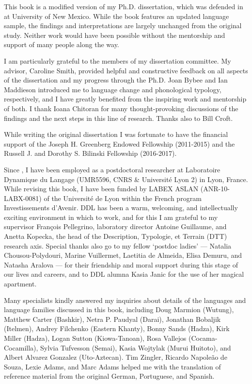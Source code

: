 \addchap{\lsAcknowledgementTitle} 

  This book is a modified version of my Ph.D. dissertation, which was defended in \citealt{May2017} at University of New Mexico. While the book features an updated language sample, the findings and interpretations are largely unchanged from the original study. Neither work would have been possible without the mentorship and support of many people along the way.



  I am particularly grateful to the members of my dissertation committee. My advisor, Caroline Smith, provided helpful and constructive feedback on all aspects of the dissertation and my progress through the Ph.D. Joan Bybee and Ian Maddieson introduced me to language change and phonological typology, respectively, and I have greatly benefited from the inspiring work and mentorship of both. I thank Ioana Chitoran for many thought-provoking discussions of the findings and the next steps in this line of research. Thanks also to Bill Croft.



  While writing the original dissertation I was fortunate to have the financial support of the Joseph H. Greenberg Endowed Fellowship (2011-2015) and the Russell J. and Dorothy S. Bilinski Fellowship (2016-2017).



  Since \citealt{October2017}, I have been employed as a postdoctoral researcher at Laboratoire Dynamique du Langage (UMR5596, CNRS \& Université Lyon 2) in Lyon, France. While revising this book, I have been funded by LABEX ASLAN (ANR-10-LABX-0081) of the Université de Lyon within the French program Investissements d’Avenir. DDL has been a warm, welcoming, and intellectually exciting environment in which to work, and for this I am grateful to my supervisor François Pellegrino, laboratory director Antoine Guillaume, and Anetta Kopecka, the head of the Description, Typologie, et Terrain (DTT) research axis. Special thanks also go to my fellow ‘postdoc ladies’ — Natalia Chousou-Polydouri, Marine Vuillermet, Laetitia de Almeida, Elisa Demuru, and Natasha Aralova — for their friendship and moral support during this stage of our lives and careers, and to DDL alumna Kasia Janic for the use of her magical apartment.



  Many specialists kindly answered my inquiries about details of the languages and language families discussed in this book, including Doug Marmion (Wutung), Matthew Carter (Bashkir), Netra P. Paudyal (Darai), Jonathan Bobaljik (Itelmen), Andrey Filchenko (Eastern Khanty), Bonny Sands (Hadza), Kirk Miller (Hadza), Logan Sutton (Kiowa-Tanoan), Rosa Vallejos (Cocama-Cocamilla), Sylvia Tufvesson (Semai), Kasia Wojtylak (Murui Huitoto), and Albert Alvarez Gonzalez (Uto-Aztecan). Tim Zingler, Ricardo Napoleão de Souza, Lexie Adams, and Marc Adams helped me with the translation of reference material from the original German, Portuguese, and Spanish.



